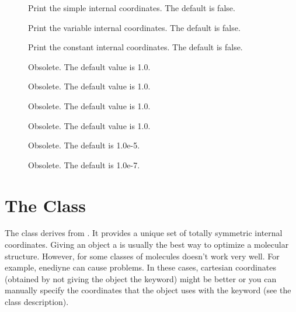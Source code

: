\begin{description}
  \item[] Print the simple internal coordinates.
     The default is false.
               
  \item[] Print the variable internal
     coordinates.  The default is false.
               
  \item[] Print the constant internal
     coordinates.  The default is false.
               
  \item[] Obsolete.  The default value is 1.0.

  \item[] Obsolete.  The default value is 1.0.
               
  \item[] Obsolete.  The default value is 1.0.

  \item[] Obsolete.  The default value is 1.0.

  \item[] Obsolete.  The default is 1.0e-5.

  \item[] Obsolete.  The default is 1.0e-7.

\end{description}



\section{The  Class}\label{SymmMolecularCoor}

The  class derives from
.  It provides a unique set of totally symmetric
internal coordinates.  Giving an  object a
 is usually the best way to optimize a molecular structure.
However, for some classes of molecules  doesn't
work very well.  For example, enediyne can cause problems.  In these cases,
cartesian coordinates (obtained by not giving the
 object the  keyword) might be better
or you can manually specify the coordinates that the
 object uses with the  keyword
(see the  class description).

